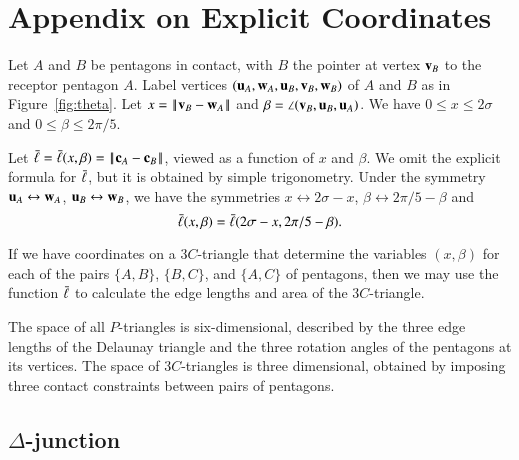 \section{Appendix on Explicit Coordinates}
\label{sec:appendix}

Let $A$ and $B$ be pentagons in contact, with $B$ the pointer at
vertex ${\mathbf v}_B$ to the receptor pentagon $A$.  Label vertices
$({\mathbf u}_A,{\mathbf w}_A,{\mathbf u}_B,{\mathbf v}_B,{\mathbf w}_B)$ of $A$ and $B$ as in
Figure~\ref{fig:theta}.  Let $x=\norm{\v_B}{\w_A}$ and $\beta =
\angle({\mathbf v}_B,{\mathbf u}_B,{\mathbf u}_A)$.  We have $0\le x\le 2\sigma$ and $0\le
\beta\le 2\pi/5$.



Let $\bl = \bl(x,\beta) = \norm{\c_A}{\c_B}$, viewed as a function of
$x$ and $\beta$.  We omit the explicit formula for $\bar\ell$, but it is
obtained by simple trigonometry.  Under the symmetry
${\mathbf u}_A\leftrightarrow {\mathbf w}_A$, ${\mathbf u}_B\leftrightarrow{\mathbf w}_B$, we have the
symmetries $x\leftrightarrow 2\sigma-x$, $\beta\leftrightarrow
2\pi/5-\beta$ and
\[
\bar\ell(x,\beta) = \bar\ell(2\sigma-x,2\pi/5 - \beta).
\]

If we have coordinates on a $3C$-triangle that determine the variables
$(x,\beta)$ for each of the pairs $\{A,B\}$, $\{B,C\}$, and $\{A,C\}$
of pentagons, then we may use the function $\bar\ell$ to calculate the edge
lengths and area of the $3C$-triangle.

The space of all $P$-triangles is six-dimensional, described by the
three edge lengths of the Delaunay triangle and the three rotation
angles of the pentagons at its vertices.  The space of $3C$-triangles
is three dimensional, obtained by imposing three contact constraints
between pairs of pentagons.

\subsection{$\Delta$-junction}


